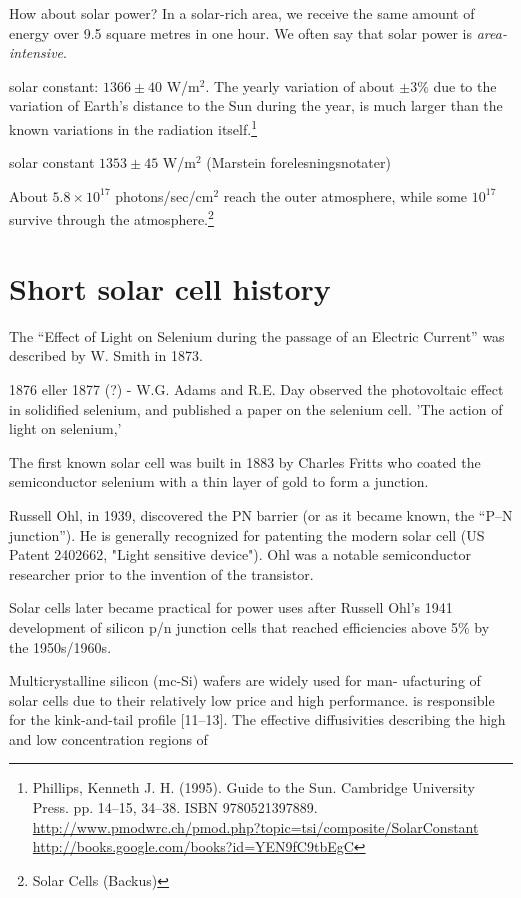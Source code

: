 \documentclass[11pt]{scrbook}   %
\begin{document}
How about solar power? In a solar-rich area, we receive the same amount of energy 
over 9.5 square metres in one hour. We often say that solar power is 
\emph{area-intensive}.


solar constant: $1366\pm 40$ W/m$^2$. The yearly variation of about $\pm 3\%$ 
due to the variation of Earth's distance to the Sun during the year, is much
larger than the known variations in the radiation itself.\footnote{
Phillips, Kenneth J. H. (1995). Guide to the Sun. Cambridge University Press. 
pp. 14–15, 34–38. ISBN 9780521397889.
\url{http://www.pmodwrc.ch/pmod.php?topic=tsi/composite/SolarConstant}
\url{http://books.google.com/books?id=YEN9fC9tbEgC}
}

solar constant $1353\pm 45$ W/m$^2$ (Marstein forelesningsnotater)

About $5.8\times 10^{17}$ photons/sec/cm$^2$ reach the outer atmosphere, while
some $10^{17}$ survive through the atmosphere.\footnote{Solar Cells (Backus)}


\section{Short solar cell history}

The ``Effect of Light on Selenium during the passage of an Electric Current''
was described by W. Smith in 1873\cite{Smith:1873}.

1876 eller 1877 (?) - W.G. Adams and R.E. Day observed the photovoltaic effect in solidified 
selenium, and published a paper on the selenium cell. 'The action of light 
on selenium,'\cite{Adams:1876}

The first known solar cell was built in 1883 by Charles Fritts who coated the
semiconductor selenium with a thin layer of gold to form a junction.

Russell Ohl, in 1939, discovered the PN barrier (or as it became known, 
the “P–N junction”). He is generally recognized for patenting the modern solar 
cell (US Patent 2402662, "Light sensitive device"). Ohl was a notable 
semiconductor researcher prior to the invention of the transistor. 

Solar cells later became practical for power uses after Russell Ohl's 1941 
development of silicon p/n junction cells that reached efficiencies above 
5\% by the 1950s/1960s.

Multicrystalline silicon (mc-Si) wafers are widely used for man- 
ufacturing of solar cells due to their relatively low price and high 
performance. is responsible for the kink-and-tail profile [11–13]. The effective 
diffusivities describing the high and low concentration regions of 
\end{document}
